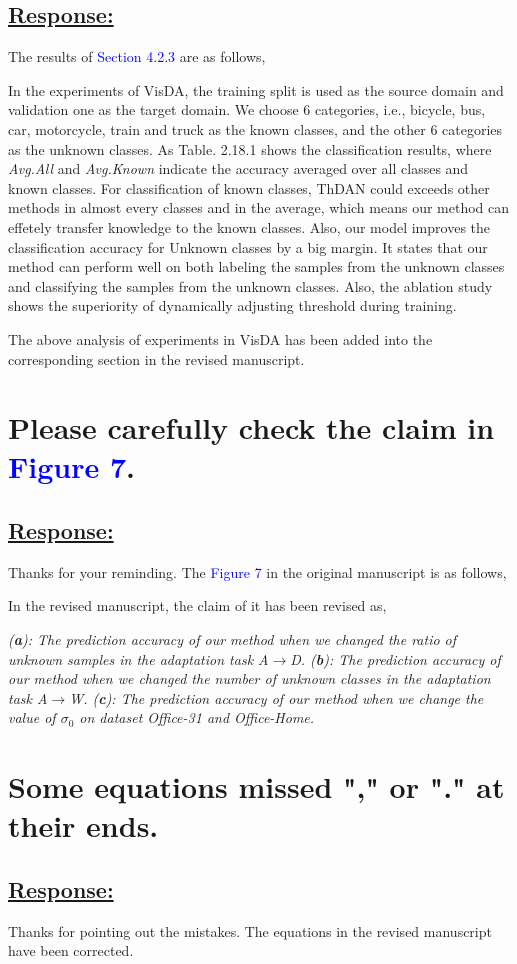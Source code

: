 \subsection*{\underline{\textbf{Response:}}}

The results of \textcolor{blue}{Section 4.2.3} are as follows,


In the experiments of VisDA, the training split is used as the source domain and validation one as the target domain. 
We choose 6 categories, i.e., bicycle, bus, car, motorcycle, train and truck as the known classes, and the other 6 categories as the unknown classes. 
As Table. 2.18.1 shows the classification results, where \textit{Avg.All} and \textit{Avg.Known} indicate the accuracy averaged over all classes and known classes. 
For classification of known classes, ThDAN could exceeds other methods in almost every classes and in the average, which means our method can effetely transfer knowledge to the known classes. 
Also, our model improves the classification accuracy for Unknown classes by a big margin. 
It states that our method can perform well on both labeling the samples from the unknown classes and classifying the samples from the unknown classes. Also, the ablation study shows the superiority of dynamically adjusting threshold during training. 

The above analysis of experiments in VisDA has been added into the corresponding section in the revised manuscript.

\section{
    Please carefully check the claim in \textcolor{blue}{Figure 7}.  
}

\subsection*{\underline{\textbf{Response:}}}

Thanks for your reminding.
The \textcolor{blue}{Figure 7} in the original manuscript is as follows,


In the revised manuscript, the claim of it has been revised as,
\begin{siderules}
    \textit{
        \footnotesize
        (\textbf{a}): 
        The prediction accuracy of our method when we changed the ratio of unknown samples in the adaptation task \textit{A$\to$D}. 
        (\textbf{b}): 
        The prediction accuracy of our method when we changed the number of unknown classes in the adaptation task \textit{A$\to$W}. 
        (\textbf{c}): The prediction accuracy of our method when we change the value of $\sigma_0$ on dataset Office-31 and Office-Home. 
    }
\end{siderules}


\section{
    Some equations missed "," or "." at their ends.  
}

\subsection*{\underline{\textbf{Response:}}}

Thanks for pointing out the mistakes.
The equations in the revised manuscript have been corrected.


